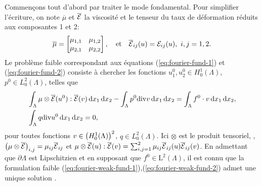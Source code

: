 Commençons tout d'abord par traiter le mode fondamental. Pour
simplifier l'écriture, on note $\overline{\mu}$ et
$\overline{\mathcal E}$ la viscosité et le tenseur du taux de
déformation réduits aux composantes 1 et 2:
\begin{equation}
 \overline{\mu} = \begin{bmatrix}
  \mu_{1,1} & \mu_{1,2} \\
  \mu_{2,1} & \mu_{2,2}
 \end{bmatrix},\quad \text{et} \quad \overline{\mathcal E}_{ij}(u) =
 \mathcal E_{ij}(u),\ i,j = 1,2.
\end{equation}
Le problème faible correspondant aux équations
(\ref{eq:fourier-fund-1}) et (\ref{eq:fourier-fund-2}) consiste à
chercher les fonctions $u_1^0,u_2^0 \in H^1_0(\Lambda)$, $p^0 \in
L^2_0(\Lambda)$, telles que
\begin{align}
  &\int_\Lambda \mu\otimes \overline{\mathcal E}(u^0) : \overline{\mathcal E}(v) \,\mathrm dx_1\,\mathrm dx_2 -
  \int_\Lambda p^0\mathrm{div} v \,\mathrm dx_1\,\mathrm dx_2 = \int_\Lambda f^0\cdot v
  \,\mathrm dx_1\,\mathrm dx_2,\label{eq:fourier-weak-fund-1}\\
  &\int_\Lambda q\mathrm{div} u^0 \,\mathrm dx_1\,\mathrm dx_2 = 0,\label{eq:fourier-weak-fund-2}
\end{align}
pour toutes fonctions $v \in \left( H^1_0(\Lambda) \right)^2$, $q \in
L_0^2(\Lambda)$. Ici $\otimes$ est le produit tensoriel, \ie,
$\left( \mu\otimes\overline{\mathcal E} \right)_{i,j} =
\mu_{ij}\overline{\mathcal E}_{ij}$ et $\mu\otimes\overline{\mathcal E}(u):\overline{\mathcal E}(v) =
\sum_{i,j = 1}^2\mu_{ij}\overline{\mathcal E}_{ij}(u)\overline{\mathcal E}_{ij}(v)$.
En admettant que $\partial \Lambda$ est Lipschitzien et en supposant
que $f^0\in \mathrm L^2(\Lambda)$, il est connu que la formulation
faible (\ref{eq:fourier-weak-fund-1}),(\ref{eq:fourier-weak-fund-2})
admet une unique solution \cite{Temam1977}.


